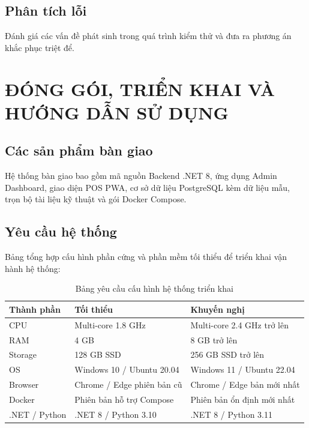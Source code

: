 \documentclass[12pt,a4paper]{report}
\begin{document}
	\section{Phân tích lỗi}
	Đánh giá các vấn đề phát sinh trong quá trình kiểm thử và đưa ra phương án khắc phục triệt để.
	
	\chapter{ĐÓNG GÓI, TRIỂN KHAI VÀ HƯỚNG DẪN SỬ DỤNG}
	\section{Các sản phẩm bàn giao}
	Hệ thống bàn giao bao gồm mã nguồn Backend .NET 8, ứng dụng Admin Dashboard, giao diện POS PWA, cơ sở dữ liệu PostgreSQL kèm dữ liệu mẫu, trọn bộ tài liệu kỹ thuật và gói Docker Compose.
	
	\section{Yêu cầu hệ thống}
	Bảng tổng hợp cấu hình phần cứng và phần mềm tối thiểu để triển khai vận hành hệ thống:
	\begin{table}[H]
		\centering
		\caption{Bảng yêu cầu cấu hình hệ thống triển khai}
		\begin{tabularx}{\textwidth}{p{} p{} p{}}
			\toprule
			\textbf{Thành phần} & \textbf{Tối thiểu} & \textbf{Khuyến nghị}\\
			\midrule
			CPU & Multi-core 1.8 GHz & Multi-core 2.4 GHz trở lên\\
			RAM & 4 GB & 8 GB trở lên\\
			Storage & 128 GB SSD & 256 GB SSD trở lên\\
			OS & Windows 10 / Ubuntu 20.04 & Windows 11 / Ubuntu 22.04\\
			Browser & Chrome / Edge phiên bản cũ & Chrome / Edge bản mới nhất\\
			Docker & Phiên bản hỗ trợ Compose & Phiên bản ổn định mới nhất\\
			.NET / Python & .NET 8 / Python 3.10 & .NET 8 / Python 3.11\\
			\bottomrule
		\end{tabularx}
	\end{table}
	
\end{document}
